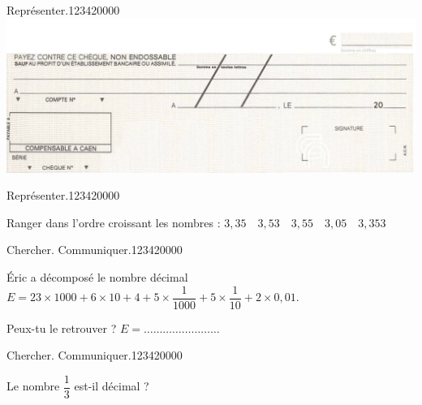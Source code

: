 \begin{pageParcourst}
\begin{ExoCt}{Représenter.}{1234}{2}{0}{0}{0}{0}
 \includegraphics[scale=1]{FIG/spechequedebanque.jpg} 
 
\end{ExoCt}
 
\begin{ExoCt}{Représenter.}{1234}{2}{0}{0}{0}{0}
 


Ranger dans l'ordre croissant les nombres : $3,35 \quad 3,53 \quad 3,55 \quad 3,05 \quad 3,353$
 
\end{ExoCt}
 
\begin{ExoCt}{Chercher. Communiquer.}{1234}{2}{0}{0}{0}{0}
 
Éric a décomposé le nombre décimal  $E = 23\times 1000 + 6\times 10 + 4 +  5\times \dfrac{1}{1000} + 5\times \dfrac{1}{10} +  2\times 0,01 $. 

Peux-tu le retrouver ? $E = \ldots\ldots\ldots\ldots\ldots\ldots\ldots\ldots $
\end{ExoCt}

\begin{ExoCt}{Chercher. Communiquer.}{1234}{2}{0}{0}{0}{0}

Le nombre $\dfrac{1}{3}$ est-il décimal ?
 
\end{ExoCt}
 

\end{pageParcourst}



